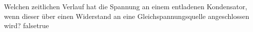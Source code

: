     {Welchen zeitlichen Verlauf hat die Spannung an einem entladenen Kondensator, wenn dieser über einen Widerstand an eine Gleichspannungsquelle angeschlossen wird?}
    {}
    {}
    {}
    {}
    {false}{true}